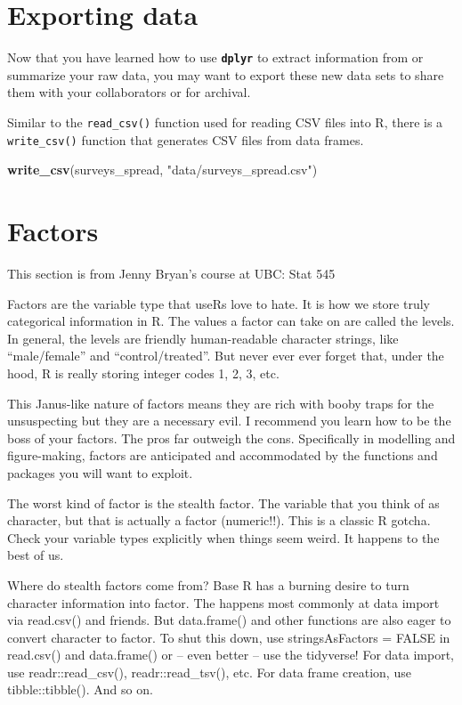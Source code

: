 \documentclass[]{book}
\newenvironment{Shaded}{\begin{snugshade}}{\end{snugshade}}
\newcommand{\KeywordTok}[1]{\textcolor[rgb]{0.13,0.29,0.53}{\textbf{#1}}}
\newcommand{\StringTok}[1]{\textcolor[rgb]{0.31,0.60,0.02}{#1}}
\newcommand{\NormalTok}[1]{#1}
\begin{document}
\section{Exporting data}\label{exporting-data}

Now that you have learned how to use \textbf{\texttt{dplyr}} to extract
information from or summarize your raw data, you may want to export
these new data sets to share them with your collaborators or for
archival.

Similar to the \texttt{read\_csv()} function used for reading CSV files
into R, there is a \texttt{write\_csv()} function that generates CSV
files from data frames.

\begin{Shaded}
\begin{Highlighting}[]
\KeywordTok{write_csv}\NormalTok{(surveys_spread, }\StringTok{"data/surveys_spread.csv"}\NormalTok{)}
\end{Highlighting}
\end{Shaded}

\section{Factors}\label{factors}

This section is from Jenny Bryan's course at UBC: Stat 545

Factors are the variable type that useRs love to hate. It is how we
store truly categorical information in R. The values a factor can take
on are called the levels. In general, the levels are friendly
human-readable character strings, like ``male/female'' and
``control/treated''. But never ever ever forget that, under the hood, R
is really storing integer codes 1, 2, 3, etc.

This Janus-like nature of factors means they are rich with booby traps
for the unsuspecting but they are a necessary evil. I recommend you
learn how to be the boss of your factors. The pros far outweigh the
cons. Specifically in modelling and figure-making, factors are
anticipated and accommodated by the functions and packages you will want
to exploit.

The worst kind of factor is the stealth factor. The variable that you
think of as character, but that is actually a factor (numeric!!). This
is a classic R gotcha. Check your variable types explicitly when things
seem weird. It happens to the best of us.

Where do stealth factors come from? Base R has a burning desire to turn
character information into factor. The happens most commonly at data
import via read.csv() and friends. But data.frame() and other functions
are also eager to convert character to factor. To shut this down, use
stringsAsFactors = FALSE in read.csv() and data.frame() or -- even
better -- use the tidyverse! For data import, use readr::read\_csv(),
readr::read\_tsv(), etc. For data frame creation, use tibble::tibble().
And so on.
\end{document}
